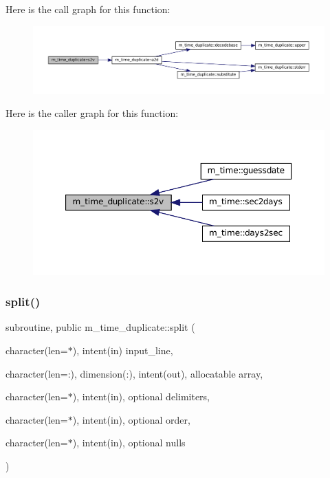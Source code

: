 Here is the call graph for this function\+:\nopagebreak
\begin{figure}[H]
\begin{center}
\leavevmode
\includegraphics[width=350pt]{namespacem__time__duplicate_a118f0d70fa6f319fbd773008c7f86ef9_cgraph}
\end{center}
\end{figure}
Here is the caller graph for this function\+:\nopagebreak
\begin{figure}[H]
\begin{center}
\leavevmode
\includegraphics[width=350pt]{namespacem__time__duplicate_a118f0d70fa6f319fbd773008c7f86ef9_icgraph}
\end{center}
\end{figure}
\mbox{\label{namespacem__time__duplicate_a326e0d62d92969a231864997eea2ab98}} 
\subsubsection{\texorpdfstring{split()}{split()}}
{\footnotesize\ttfamily subroutine, public m\+\_\+time\+\_\+duplicate\+::split (\begin{DoxyParamCaption}\item[{character(len=$\ast$), intent(in)}]{input\+\_\+line,  }\item[{character(len=\+:), dimension(\+:), intent(out), allocatable}]{array,  }\item[{character(len=$\ast$), intent(in), optional}]{delimiters,  }\item[{character(len=$\ast$), intent(in), optional}]{order,  }\item[{character(len=$\ast$), intent(in), optional}]{nulls }\end{DoxyParamCaption})}



